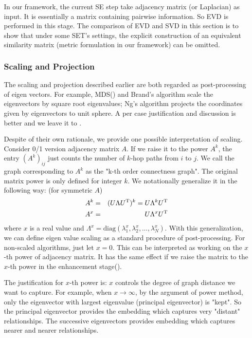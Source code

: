 In our framework, the current SE step take adjacency matrix
(or Laplacian) as input. It is essentially a matrix containing 
pairwise information. So EVD is performed in this stage. 
The comparison of EVD and SVD in this section is to show that 
under some SET's settings, the explicit construction of an 
equivalent similarity matrix (metric formulation in our framework)
can be omitted. 

\subsubsection{Scaling and Projection}
\label{sec:postproc}

The scaling and projection described earlier are 
both regarded as post-processing of eigen vectors. 
For example, MDS(\rsec{\ref{sec:mds}}) and Brand's algorithm
\cite{brand2003unifying} scale the eigenvectors by square root
eigenvalues; Ng's algorithm \cite{ng2002spectral} projects 
the coordinates given by eigenvectors to unit sphere. 
A per case justification and discussion is better and 
we leave it to \rsec{\ref{sec:justification}}. 

Despite of their own rationale, we provide one possible interpretation 
of scaling. Consider 0/1 version adjacency matrix $ A $. If we raise it to the power
$ A^k $, the entry $ (A^k)_{ij} $ just counts the number of $ k $-hop paths 
from $ i $ to $ j $. 
We call the graph corresponding to $ A^k $ as the "k-th order connectness graph". 
The original matrix power is only defined for 
integer $ k $. We notationally generalize it in the following way:
(for symmetric $ A $)
\begin{eqnarray}
	A^k &=& (U \Lambda U^\mathrm{T})^k = U \Lambda^k U^\mathrm{T} \\
	A^x &=& U \Lambda^x U^\mathrm{T} 
\end{eqnarray}
where $ x $ is a real value and 
$ \Lambda^x = \text{diag}(\lambda_1^x, \lambda_2^x, \ldots, \lambda_N^x) $. 
With this generalization, we can define eigen value scaling as 
a standard procedure of post-processing. For non-scaled algorithms, 
just let $ x=0 $. This can be interpreted as working on the $ x $-th
power of adjacency matrix. It has the same effect if we raise the matrix
to the $ x $-th power in the enhancement stage(\rsec{\ref{sec:enhance}}). 

The justification for $ x $-th power is: $ x $ controls the degree
of graph distance we want to capture. For example, when $ x \rightarrow \infty $, 
by the argument of power method, only the eigenvector with largest eigenvalue 
(principal eigenvector) is "kept". So the principal eigenvector provides 
the embedding which captures very "distant" relationships. The successive 
eigenvectors provides embedding which captures nearer and nearer relationships. 

